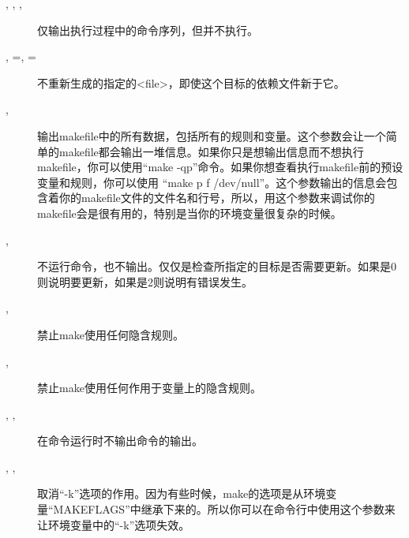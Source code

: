 \documentclass[a4paper,10pt]{sphinxmanual}
\begin{document}
\begin{description}
\item[{, , , }] \leavevmode
仅输出执行过程中的命令序列，但并不执行。

\item[{ , =, =}] \leavevmode
不重新生成的指定的\textless{}file\textgreater{}，即使这个目标的依赖文件新于它。

\item[{, }] \leavevmode
输出makefile中的所有数据，包括所有的规则和变量。这个参数会让一个简单的makefile都会输出一堆信息。如果你只是想输出信息而不想执行makefile，你可以使用“make -qp”命令。如果你想查看执行makefile前的预设变量和规则，你可以使用 “make \textendash{}p \textendash{}f /dev/null”。这个参数输出的信息会包含着你的makefile文件的文件名和行号，所以，用这个参数来调试你的 makefile会是很有用的，特别是当你的环境变量很复杂的时候。

\item[{, }] \leavevmode
不运行命令，也不输出。仅仅是检查所指定的目标是否需要更新。如果是0则说明要更新，如果是2则说明有错误发生。

\item[{, }] \leavevmode
禁止make使用任何隐含规则。

\item[{, }] \leavevmode
禁止make使用任何作用于变量上的隐含规则。

\item[{, , }] \leavevmode
在命令运行时不输出命令的输出。

\item[{, , }] \leavevmode
取消“-k”选项的作用。因为有些时候，make的选项是从环境变量“MAKEFLAGS”中继承下来的。所以你可以在命令行中使用这个参数来让环境变量中的“-k”选项失效。


\end{description}
\end{document}
